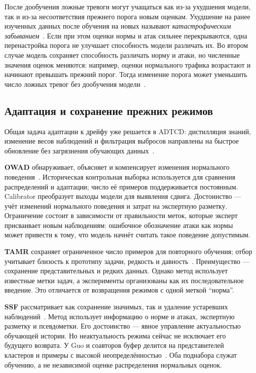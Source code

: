 После дообучения ложные тревоги могут учащаться как из-за
ухудшения модели, так и из-за несоответствия прежнего порога
новым оценкам. Ухудшение на ранее изученных данных после
обучения на новых называют \emph{катастрофическим
забыванием}~\cite{MIR2019}. Если при этом оценки нормы и атак
сильнее перекрываются, одна перенастройка порога не улучшает
способность модели различать их. Во втором случае модель
сохраняет способность различать норму и атаки, но численные
значения оценок меняются: например, оценки нормального трафика
возрастают и начинают превышать прежний порог. Тогда изменение
порога может уменьшить число ложных тревог без дообучения
модели~\cite{LabelEfficient2026}.

\subsection{Адаптация и сохранение прежних режимов}
\label{subsec:related_network}

Общая задача адаптации к дрейфу уже решается в ADTCD:
дистилляция знаний, изменение весов наблюдений и фильтрация
выбросов направлены на быстрое обновление без загрязнения
обучающих данных~\cite{ADTCD2023}.

\textbf{OWAD} обнаруживает, объясняет и компенсирует изменения
нормального поведения~\cite{OWAD2023}. Историческая контрольная
выборка используется для сравнения распределений и адаптации;
число её примеров поддерживается постоянным. Calibrator
преобразует выходы модели для выявления сдвига. Достоинство
--- учёт изменений нормального поведения и затрат на экспертную
разметку. Ограничение состоит в зависимости от правильности
меток, которые эксперт присваивает новым наблюдениям:
ошибочное обозначение атаки как нормы может привести к тому,
что модель начнёт считать такое поведение допустимым.

\textbf{TAMR} сохраняет ограниченное число примеров для повторного
обучения; отбор учитывает близость к прототипу задачи, редкость
и давность~\cite{TAMR2025}. Преимущество --- сохранение
представительных и редких данных. Однако метод использует
известные метки задач, а эксперименты организованы как их
последовательное введение. Это отличается от возвращения
режимов с одной меткой \enquote{норма}.

\textbf{SSF} рассматривает как сохранение значимых, так и удаление
устаревших наблюдений~\cite{SSF2025}. Метод использует информацию
о норме и атаках, экспертную разметку и псевдометки. Его
достоинство --- явное управление актуальностью обучающей истории.
Но неактуальность режима сейчас не исключает его будущего возврата. У Guo и соавторов
буфер делится на представителей кластеров и примеры с высокой
неопределённостью~\cite{ContinualIDS2025}. Оба поднабора служат
обучению, а не независимой оценке распределения нормальных оценок.

